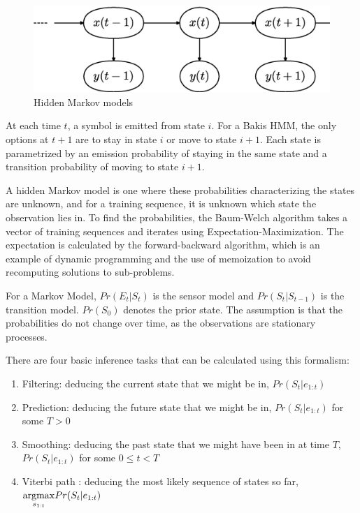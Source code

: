 \documentclass[12pt,a4,notitlepage]{report}
\renewcommand{\_}{\texttt{\symbol{95}}}
\newcommand{\<}{\texttt{\symbol{60}}}
\renewcommand{\>}{\texttt{\symbol{62}}}
\begin{document}
\begin{figure}
\centering
\includegraphics[scale=0.6,angle=0]{diagrams/markov.ps}
\caption{Hidden Markov models}
\label{hmm}
\end{figure}

At each time $t$, a symbol is emitted from state $i$. For a Bakis HMM, the only options at $t+1$ are to stay in state $i$ or move to state $i+1$\cite{Bakis}. Each state is parametrized by an emission probability of staying in the same state and a transition probability of moving to state $i+1$.

A hidden Markov model is one where these probabilities characterizing the states are unknown, and for a training sequence, it is unknown which state the observation lies in. To find the probabilities, the Baum-Welch algorithm takes a vector of training sequences and iterates using Expectation-Maximization. The expectation is calculated by the forward-backward algorithm, which is an example of dynamic programming and the use of memoization to avoid recomputing solutions to sub-problems.

For a Markov Model, $Pr(E_t|S_t)$ is the sensor model and $Pr(S_t|S_{t-1})$ is the transition model. $Pr(S_0)$ denotes the prior state. The assumption is that the probabilities do not change over time, as the observations are stationary processes.

There are four basic inference tasks that can be calculated using this formalism\cite{AIModern}:

\begin{enumerate}
\item Filtering: deducing the current state that we might be in, $Pr(S_t|e_{1:t})$
\item Prediction: deducing the future state that we might be in, $Pr(S_t|e_{1:t})$ for some $T>0$
\item Smoothing: deducing the past state that we might have been in at time $T$, $Pr(S_t|e_{1:t})$ for some $0 \le t < T$
\item Viterbi path : deducing the most likely sequence of states so far, $\underset{s_{1:t}}{\operatornamewithlimits{argmax}}Pr(S_t|e_{1:t})$
\end{enumerate}
\end{document}
